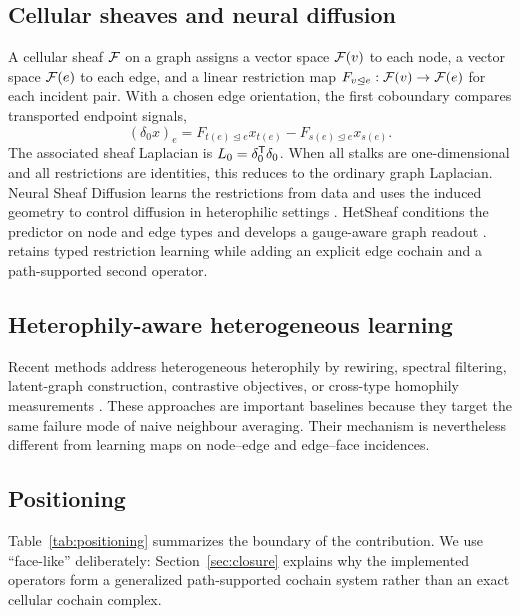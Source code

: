 \subsection{Cellular sheaves and neural diffusion}

A cellular sheaf $\mathcal{F}$ on a graph assigns a vector space $\mathcal{F}(v)$ to each node, a vector space
$\mathcal{F}(e)$ to each edge, and a linear restriction map $F_{v\unlhd e}:\mathcal{F}(v)\rightarrow\mathcal{F}(e)$ for
each incident pair. With a chosen edge orientation, the first coboundary compares transported
endpoint signals,
\begin{equation}
  (\delta_0 x)_e = F_{t(e)\unlhd e}x_{t(e)}-F_{s(e)\unlhd e}x_{s(e)}.
  \label{eq:background-delta0}
\end{equation}
The associated sheaf Laplacian is $L_0=\delta_0^{\mathsf{T}}\delta_0$. When all stalks are
one-dimensional and all restrictions are identities, this reduces to the ordinary graph
Laplacian. Neural Sheaf Diffusion learns the restrictions from data and uses the induced geometry
to control diffusion in heterophilic settings \cite{bodnar2022neural}. HetSheaf conditions the
predictor on node and edge types and develops a gauge-aware graph readout
\cite{braithwaite2024hetsheaf}. \method{} retains typed restriction learning while adding an
explicit edge cochain and a path-supported second operator.

\subsection{Heterophily-aware heterogeneous learning}

Recent methods address heterogeneous heterophily by rewiring, spectral filtering, latent-graph
construction, contrastive objectives, or cross-type homophily measurements
\cite{guo2023hdhgr,lu2024h2sgnn,shen2024latgrl,wang2025hgms,tao2025cthge}. These approaches are
important baselines because they target the same failure mode of naive neighbour averaging. Their
mechanism is nevertheless different from learning maps on node--edge and edge--face incidences.

\subsection{Positioning}

Table~\ref{tab:positioning} summarizes the boundary of the contribution. We use ``face-like''
deliberately: Section~\ref{sec:closure} explains why the implemented operators form a generalized
path-supported cochain system rather than an exact cellular cochain complex.

